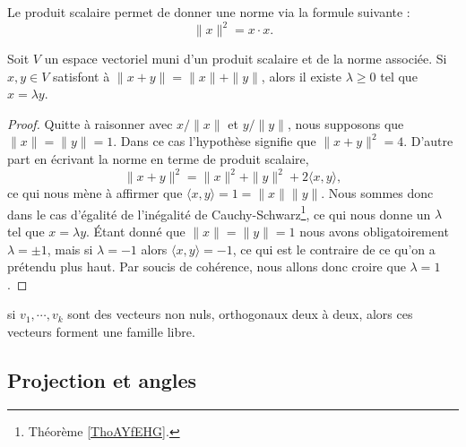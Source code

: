 Le produit scalaire permet de donner une norme via la formule suivante :
\begin{equation}
    \| x \|^2=x\cdot x.
\end{equation}

\begin{lemma}   \label{LemLPOHUme}
    Soit \( V\) un espace vectoriel muni d'un produit scalaire et de la norme associée. Si \( x,y\in V\) satisfont à \( \| x+y \|=\| x \|+\| y \|\), alors il existe \( \lambda\geq 0\) tel que \( x=\lambda y\).
\end{lemma}

\begin{proof}
    Quitte à raisonner avec \( x/\| x \|\) et \( y/\| y \|\), nous supposons que \( \| x \|=\| y \|=1\). Dans ce cas l'hypothèse signifie que \( \| x+y \|^2=4\). D'autre part en écrivant la norme en terme de produit scalaire,
    \begin{equation}
        \| x+y \|^2=\| x \|^2+\| y \|^2+2\langle x, y\rangle ,
    \end{equation}
    ce qui nous mène à affirmer que \( \langle x, y\rangle =1=\| x \|\| y \|\). Nous sommes donc dans le cas d'égalité de l'inégalité de Cauchy-Schwarz\footnote{Théorème \ref{ThoAYfEHG}.}, ce qui nous donne un \( \lambda\) tel que \( x=\lambda y\). Étant donné que \( \| x \|=\| y \|=1\) nous avons obligatoirement \( \lambda=\pm 1\), mais si \( \lambda=-1\) alors \( \langle x, y\rangle =-1\), ce qui est le contraire de ce qu'on a prétendu plus haut. Par soucis de cohérence, nous allons donc croire que \( \lambda=1\).
\end{proof}


\begin{proposition}			\label{PropVectsOrthLibres}
	si $v_1,\cdots,v_k$ sont des vecteurs non nuls, orthogonaux deux à deux, alors ces vecteurs forment une famille libre.
\end{proposition}

\subsection{Projection et angles}

